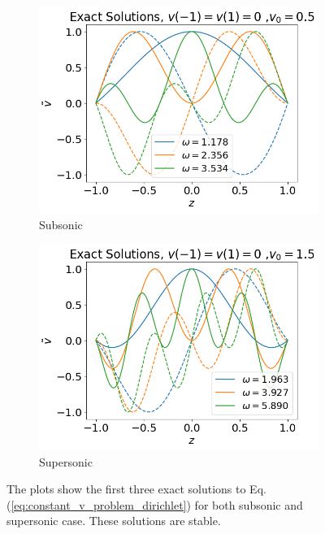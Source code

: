 \begin{figure}[H]
	\centering
	\begin{subfigure}{0.5\textwidth}
		\includegraphics[width=\linewidth]{img/theoretical_analysis/exact_v0=0.5}
		\caption{Subsonic}
	\end{subfigure}%
	\begin{subfigure}{0.5\textwidth}
		\includegraphics[width=\linewidth]{img/theoretical_analysis/exact_v0=1.5}
		\caption{Supersonic}
	\end{subfigure}
	\caption{The plots show the first three exact solutions to Eq.(\ref{eq:constant_v_problem_dirichlet}) for both subsonic and supersonic case. These solutions are stable.}
	\label{fig:exact_v}
\end{figure}



